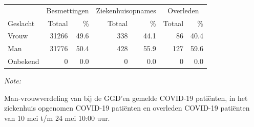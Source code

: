 \documentclass[
  english,
  man,floatsintext]{apa6}
\begin{document}
\begin{table}
\centering\begingroup\fontsize{11}{13}\selectfont

\begin{threeparttable}
\begin{tabular}{lrrrrrr}
\toprule
\multicolumn{1}{c}{ } & \multicolumn{2}{c}{Besmettingen} & \multicolumn{2}{c}{Ziekenhuisopnames} & \multicolumn{2}{c}{Overleden} \\
\cmidrule(l{3pt}r{3pt}){2-3} \cmidrule(l{3pt}r{3pt}){4-5} \cmidrule(l{3pt}r{3pt}){6-7}
Geslacht & Totaal & \% & Totaal & \% & Totaal & \%\\
\midrule
Vrouw & 31266 & 49.6 & 338 & 44.1 & 86 & 40.4\\
Man & 31776 & 50.4 & 428 & 55.9 & 127 & 59.6\\
Onbekend & 0 & 0.0 & 0 & 0.0 & 0 & 0.0\\
\bottomrule
\end{tabular}
\begin{tablenotes}
\item \textit{Note: } 
\item Man-vrouwverdeling van bij de GGD’en gemelde COVID-19 patiënten, in het ziekenhuis opgenomen COVID-19 patiënten en overleden COVID-19 patiënten van 10 mei t/m 24 mei 10:00 uur.
\end{tablenotes}
\end{threeparttable}
\endgroup{}
\end{table}
\newpage
\end{document}
